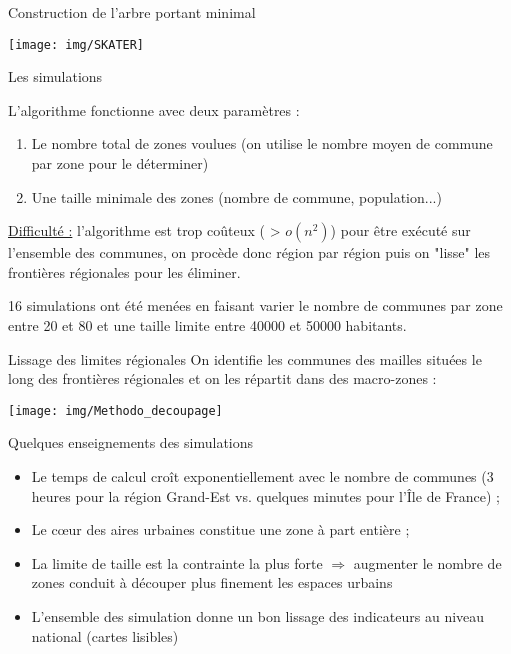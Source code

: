 \documentclass[11pt]{beamer}
\begin{document}
\begin{frame}{Construction de l'arbre portant minimal}
\begin{center}
\texttt{[image: img/SKATER]}
\end{center}
\end{frame}

\begin{frame}{Les simulations}

L'algorithme fonctionne avec deux paramètres :
\begin{enumerate}
\item Le nombre total de zones voulues (on utilise le nombre moyen de commune par zone pour le déterminer)
\item Une taille minimale des zones (nombre de commune, population...)
\end{enumerate}
\vspace{.2cm}
\underline{Difficulté :} l'algorithme est trop coûteux ( > $o(n^2)$) pour être exécuté sur l'ensemble des communes, on procède donc région par région puis on "lisse" les frontières régionales pour les éliminer.

\vspace{.2cm}

16 simulations ont été menées en faisant varier le nombre de communes par zone entre 20 et 80 et une taille limite entre 40000 et 50000 habitants.
\end{frame}

\begin{frame}{Lissage des limites régionales}
On identifie les communes des mailles situées le long des frontières régionales et on les répartit dans des macro-zones :
\begin{center}
\texttt{[image: img/Methodo\_decoupage]}
\end{center}
\end{frame}


\begin{frame}{Quelques enseignements des simulations}
\begin{itemize}
\item Le temps de calcul croît exponentiellement avec le nombre de communes (3 heures pour la région Grand-Est vs. quelques minutes pour l'Île de France) ;
\item Le c\oe ur des aires urbaines constitue une zone à part entière ;
\item La limite de taille est la contrainte la plus forte $\Rightarrow$ augmenter le nombre de zones conduit à découper plus finement les espaces urbains
\item L'ensemble des simulation donne un bon lissage des indicateurs au niveau national (cartes lisibles)
\end{itemize}
\end{frame}
\end{document}
